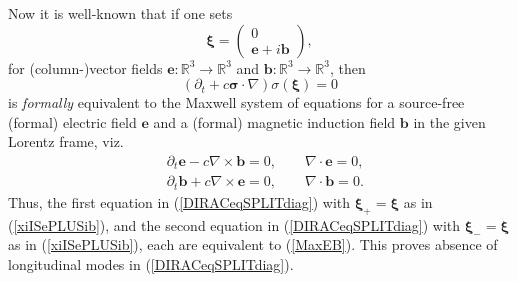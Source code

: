 \documentclass[11pt]{article}
\theoremstyle{definition}
\numberwithin{equation}{section}
\newcommand{\bb}{\mathbf{b}}
\newcommand{\be}{\mathbf{e}}
\newcommand{\beq}{\begin{equation}}
\newcommand{\eeq}{\end{equation}}
\newcommand{\p}{\partial}
\newcommand{\siV}{\boldsymbol{\sigma}}
\newcommand{\xiV}{{\boldsymbol{\xi}}}
\newcommand{\Rset}{{\mathbb R}}
\newcommand{\si}{\sigma}
\newcommand{\nab}{\nabla}
\begin{document}
 Now it is well-known \cite{LapUhl1931,OppiPHOTON,IBBphotonREV} that if one sets 
\beq \label{xiISePLUSib}
\xiV = \begin{pmatrix} 0 \\  \be + i \bb \end{pmatrix},
\eeq
for (column-)vector fields $\be:\Rset^3\to\Rset^3$ and $\bb:\Rset^3\to\Rset^3$, then 
\vspace{-5pt}
\beq \label{eq:Weyl}
(\p_t + c\siV\cdot\nab) \si(\xiV) = 0
\eeq
is \emph{formally} equivalent to the Maxwell system of equations for a source-free (formal) electric field $\be$ and a (formal) 
magnetic induction field $\bb$ in the given Lorentz frame, viz.
\beq \label{MaxEB}
\begin{array}{ll}
&\p_t\be - c\nab\times\bb = 0, \qquad \nab\cdot \be = 0,\\
&\p_t\bb + c\nab\times\be = 0, \qquad \nab\cdot \bb = 0.
\end{array}
\eeq
 Thus, the first equation in (\ref{DIRACeqSPLITdiag}) with $\xiV_+ = \xiV$ as in (\ref{xiISePLUSib}), and the second equation
in (\ref{DIRACeqSPLITdiag}) with $\xiV_- =\xiV$ as in (\ref{xiISePLUSib}), each are equivalent to (\ref{MaxEB}).
 This proves absence of longitudinal modes in (\ref{DIRACeqSPLITdiag}).
\end{document}
